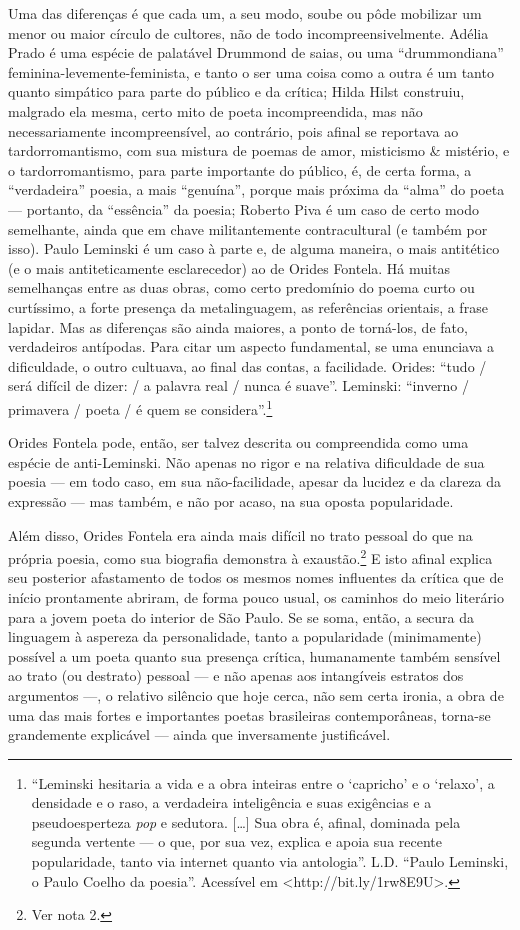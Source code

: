 Uma das
diferenças é que cada um, a seu modo, soube ou pôde mobilizar um menor ou maior círculo de cultores, não de todo incompreensivelmente. Adélia Prado é uma espécie de palatável Drummond de saias, ou uma
``drummondiana'' feminina-levemente-feminista, e tanto o ser uma coisa
como a outra é um tanto quanto simpático para parte do público e da
crítica; Hilda Hilst construiu, malgrado ela mesma, certo mito de poeta
incompreendida, mas não necessariamente incompreensível, ao contrário,
pois aﬁnal se reportava ao tardorromantismo, com sua mistura de poemas
de amor, misticismo \& mistério, e o tardorromantismo, para parte
importante do público, é, de certa forma, a ``verdadeira'' poesia, a
mais ``genuína'', porque mais próxima da ``alma'' do poeta --- portanto,
da ``essência'' da poesia; Roberto Piva é um caso de certo modo
semelhante, ainda que em chave militantemente contracultural (e também
por isso). Paulo Leminski é um caso à parte e, de alguma maneira, o mais
antitético (e o mais antiteticamente esclarecedor) ao de Orides Fontela.
Há muitas semelhanças entre as duas obras, como certo predomínio do
poema curto ou curtíssimo, a forte presença da metalinguagem, as
referências orientais, a frase lapidar. Mas as diferenças são ainda
maiores, a ponto de torná-los, de fato, verdadeiros antípodas. Para citar um aspecto fundamental,
se uma enunciava a diﬁculdade, o outro cultuava, ao ﬁnal das contas, a
facilidade. Orides: ``tudo / será difícil de dizer: / a palavra real /
nunca é suave''. Leminski: ``inverno / primavera / poeta / é quem se
considera''.\footnote{``Leminski hesitaria a vida e a obra inteiras entre o `capricho' e o `relaxo', a densidade e o raso, a verdadeira inteligência e suas
exigências e a pseudoesperteza \emph{pop} e sedutora. {[}\ldots{}{]} Sua
obra é, aﬁnal, dominada pela segunda vertente --- o que, por sua vez,
explica e apoia sua recente popularidade, tanto via internet quanto via
antologia''. L.D. ``Paulo Leminski, o Paulo Coelho da poesia''.
Acessível em \textless{}http://bit.ly/1rw8E9U\textgreater{}.}

Orides Fontela pode, então, ser talvez descrita ou
compreendida como uma espécie de anti-Leminski. Não apenas no rigor e na
relativa diﬁculdade de sua poesia --- em todo caso, em sua
não-facilidade, apesar da lucidez e da clareza da expressão --- mas
também, e não por acaso, na sua oposta popularidade.

Além disso, Orides Fontela era ainda mais difícil no trato pessoal do
que na própria poesia, como sua biograﬁa demonstra à exaustão.\footnote{Ver nota 2.} E isto
aﬁnal explica seu posterior afastamento de todos os mesmos nomes inﬂuentes da crítica que de início prontamente abriram, de forma pouco
usual, os caminhos do meio literário para a jovem poeta do interior de
São Paulo. Se se soma, então, a secura da linguagem à aspereza da
personalidade, tanto a popularidade (minimamente) possível a um poeta
quanto sua presença crítica, humanamente também sensível ao trato (ou
destrato) pessoal --- e não apenas aos intangíveis estratos dos
argumentos ---, o relativo silêncio que hoje cerca, não sem certa
ironia, a obra de uma das mais fortes e importantes poetas brasileiras
contemporâneas, torna-se grandemente explicável --- ainda que
inversamente justiﬁcável.

